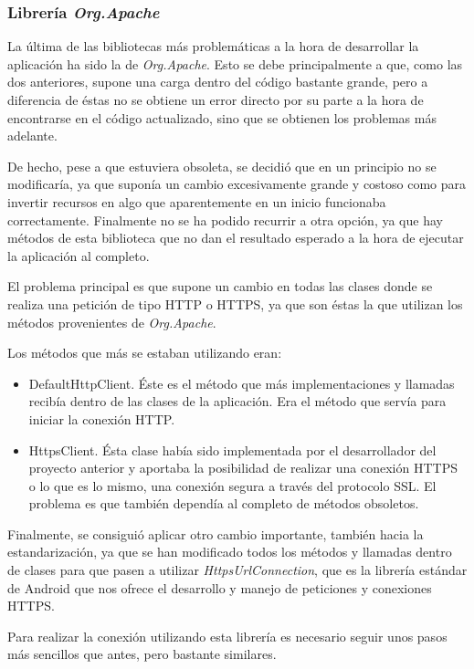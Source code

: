 \subsubsection{Librería \textit{Org.Apache}}

La última de las bibliotecas más problemáticas a la hora de desarrollar la aplicación ha sido la de \textit{Org.Apache}. Esto se debe principalmente a que, como las dos anteriores, supone una carga dentro del código bastante grande, pero a diferencia de éstas no se obtiene un error directo por su parte a la hora de encontrarse en el código actualizado, sino que se obtienen los problemas más adelante.

De hecho, pese a que estuviera obsoleta, se decidió que en un principio no se modificaría, ya que suponía un cambio excesivamente grande y costoso como para invertir recursos en algo que aparentemente en un inicio funcionaba correctamente. Finalmente no se ha podido recurrir a otra opción, ya que hay métodos de esta biblioteca que no dan el resultado esperado a la hora de ejecutar la aplicación al completo.

El problema principal es que supone un cambio en todas las clases donde se realiza una petición de tipo HTTP o HTTPS, ya que son éstas la que utilizan los métodos provenientes de \textit{Org.Apache}. 

Los métodos que más se estaban utilizando eran:

\begin{itemize}
\item DefaultHttpClient. Éste es el método que más implementaciones y llamadas recibía dentro de las clases de la aplicación. Era el método que servía para iniciar la conexión HTTP.
\item HttpsClient. Ésta clase había sido implementada por el desarrollador del proyecto anterior \cite{tfm1} y aportaba la posibilidad de realizar una conexión HTTPS o lo que es lo mismo, una conexión segura a través del protocolo SSL. El problema es que también dependía al completo de métodos obsoletos.
\end{itemize}

Finalmente, se consiguió aplicar otro cambio importante, también hacia la estandarización, ya que se han modificado todos los métodos y llamadas dentro de clases para que pasen a utilizar \textit{HttpsUrlConnection}, que es la librería estándar de Android que nos ofrece el desarrollo y manejo de peticiones y conexiones HTTPS.

Para realizar la conexión utilizando esta librería es necesario seguir unos pasos más sencillos que antes, pero bastante similares.

